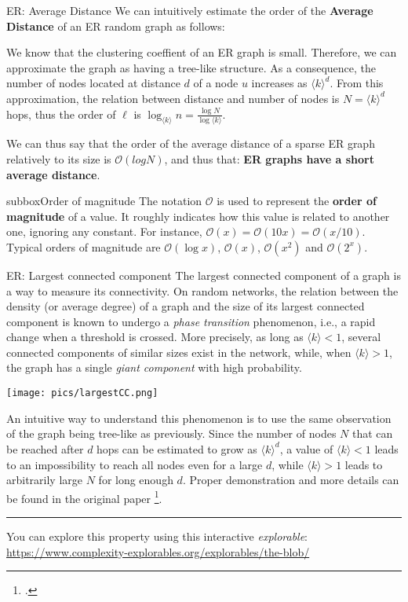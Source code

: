 \begin{textbox}{ER: Average Distance}
    We can intuitively estimate the order of the \textbf{Average Distance} of an ER random graph as follows:

    We know that the clustering coeffient of an ER graph is small. Therefore, we can approximate the graph as having a tree-like structure. As a consequence, the number of nodes located at distance $d$ of a node $u$ increases as $\langle k \rangle^d$. From this approximation, the relation between distance and number of nodes is $N=\langle k \rangle^d$ hops, thus the order of $\ell$ is  $\log_{\langle k \rangle}n=\frac{\log N}{\log \langle k \rangle}$.

    We can thus say that the order of the average distance of a sparse ER graph relatively to its size is $\mathcal{O}(log N)$, and thus that: \textbf{ER graphs have a short average distance}.
\end{textbox}


\begin{subbox}{subbox}{Order of magnitude}
    The notation $\mathcal{O}$ is used to represent the \textbf{order of magnitude} of a value. It roughly indicates how this value is related to another one, ignoring any constant. For instance, $\mathcal{O}(x)=\mathcal{O}(10x)=\mathcal{O}(x/10)$. Typical orders of magnitude are $\mathcal{O}(\log x)$, $\mathcal{O}( x)$, $\mathcal{O}(x^2)$ and $\mathcal{O}(2^x)$.
\end{subbox}


\begin{textbox}{ER: Largest connected component}
    The largest connected component of a graph is a way to measure its connectivity. On random networks, the relation between the density (or average degree) of a graph and the size of its largest connected component is known to undergo a \textit{phase transition} phenomenon, i.e., a rapid change when a threshold is crossed. More precisely, as long as $\langle k \rangle<1$, several connected components of similar sizes exist in the network, while, when  $\langle k \rangle>1$, the graph has a single \textit{giant component} with high probability.

    \begin{center}
        \texttt{[image: pics/largestCC.png]}
    \end{center}

    An intuitive way to understand this phenomenon is to use the same observation of the graph being tree-like as previously. Since the number of nodes $N$ that can be reached after $d$ hops can be estimated to grow as $\langle k \rangle^d$, a value of $\langle k \rangle<1$ leads to an impossibility to reach all nodes even for a large $d$, while $\langle k \rangle>1$ leads to arbitrarily large $N$ for long enough $d$. Proper demonstration and more details can be found in the original paper  \footcite{erdHos1960evolution}.

    \noindent\rule{4cm}{0.1pt}

    You can explore this property using this interactive \textit{explorable}: \url{https://www.complexity-explorables.org/explorables/the-blob/}
\end{textbox}

